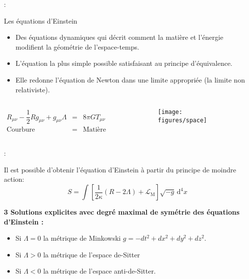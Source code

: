 \begin{frame}{\underline{\secname} : {\small \subsecname}}
\begin{block}{\Rightarrow Les équations d’Einstein}
\begin{itemize}
  \setlength\itemsep{0.5em}
\item Des équations dynamiques qui décrit comment la matière et l’énergie modifient la géométrie de l’espace-temps.
\item  L’équation la plus simple possible satisfaisant au principe d’équivalence.
\item Elle redonne l’équation de Newton dans une limite appropriée (la limite non relativiste).
\end{itemize}

\begin{columns}
	\begin{column}{0.5\linewidth}

\begin{eqnarray*}\label{einstien}
R_{\mu\nu}-\dfrac{1}{2}Rg_{\mu\nu}+g_{\mu\nu}\Lambda&=&8\pi GT_{\mu\nu} \\
\text{Courbure} &=&  \text{Matière énergie}
\end{eqnarray*}



\end{column}
\begin{column}{0.5\linewidth}

\begin{figure}
	\centering
	\texttt{[image: figures/space]}
\end{figure}

\end{column}
\end{columns}

\end{block}


\end{frame}
\begin{frame}{\underline{\secname} : {\small \subsecname}}

Il est possible d'obtenir l'équation d'Einstein à partir du principe de moindre action: 
\begin{equation*}	
{\displaystyle S=\int \left[{\frac {1}{2\kappa }}(R-2\Lambda )+{\mathcal {L}}_{\mathrm {M} }\right]{\sqrt {-g}}\,\mathrm {d} ^{4}x}
\end{equation*}
\vspace{20pt}

\pause
\textbf{3 Solutions explicites avec degré maximal de symétrie des équations d'Einstein :}
\begin{itemize}
	  \setlength\itemsep{0.5em}
	\item Si $\Lambda = 0$ \Rightarrow la métrique de Minkowski $g=-dt^2+dx^2+dy^2+dz^2$.
	\item Si $\Lambda  > 0$ \Rightarrow la métrique de l'espace de-Sitter
	\item Si $\Lambda < 0$ \Rightarrow la métrique de l'espace anti-de-Sitter.
\end{itemize}


\end{frame}

